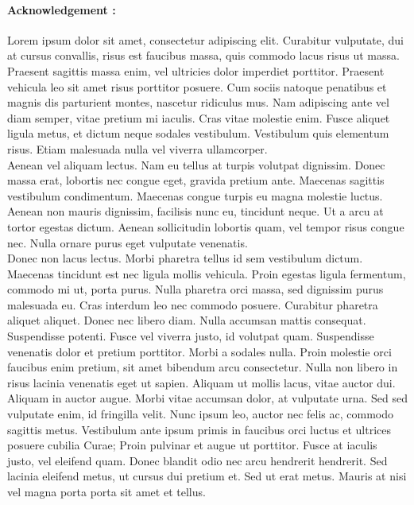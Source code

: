 \documentclass[12pt,a4paper]{article}
\begin{document}
\paragraph{Acknowledgement : }
Lorem ipsum dolor sit amet, consectetur adipiscing elit. Curabitur vulputate, dui at cursus convallis, risus est faucibus massa, quis commodo lacus risus ut massa. Praesent sagittis massa enim, vel ultricies dolor imperdiet porttitor. Praesent vehicula leo sit amet risus porttitor posuere. Cum sociis natoque penatibus et magnis dis parturient montes, nascetur ridiculus mus. Nam adipiscing ante vel diam semper, vitae pretium mi iaculis. Cras vitae molestie enim. Fusce aliquet ligula metus, et dictum neque sodales vestibulum. Vestibulum quis elementum risus. Etiam malesuada nulla vel viverra ullamcorper.\\

Aenean vel aliquam lectus. Nam eu tellus at turpis volutpat dignissim. Donec massa erat, lobortis nec congue eget, gravida pretium ante. Maecenas sagittis vestibulum condimentum. Maecenas congue turpis eu magna molestie luctus. Aenean non mauris dignissim, facilisis nunc eu, tincidunt neque. Ut a arcu at tortor egestas dictum. Aenean sollicitudin lobortis quam, vel tempor risus congue nec. Nulla ornare purus eget vulputate venenatis.\\

Donec non lacus lectus. Morbi pharetra tellus id sem vestibulum dictum. Maecenas tincidunt est nec ligula mollis vehicula. Proin egestas ligula fermentum, commodo mi ut, porta purus. Nulla pharetra orci massa, sed dignissim purus malesuada eu. Cras interdum leo nec commodo posuere. Curabitur pharetra aliquet aliquet. Donec nec libero diam. Nulla accumsan mattis consequat.\\

Suspendisse potenti. Fusce vel viverra justo, id volutpat quam. Suspendisse venenatis dolor et pretium porttitor. Morbi a sodales nulla. Proin molestie orci faucibus enim pretium, sit amet bibendum arcu consectetur. Nulla non libero in risus lacinia venenatis eget ut sapien. Aliquam ut mollis lacus, vitae auctor dui.\\

Aliquam in auctor augue. Morbi vitae accumsan dolor, at vulputate urna. Sed sed vulputate enim, id fringilla velit. Nunc ipsum leo, auctor nec felis ac, commodo sagittis metus. Vestibulum ante ipsum primis in faucibus orci luctus et ultrices posuere cubilia Curae; Proin pulvinar et augue ut porttitor. Fusce at iaculis justo, vel eleifend quam. Donec blandit odio nec arcu hendrerit hendrerit. Sed lacinia eleifend metus, ut cursus dui pretium et. Sed ut erat metus. Mauris at nisi vel magna porta porta sit amet et tellus.\\
\end{document}

